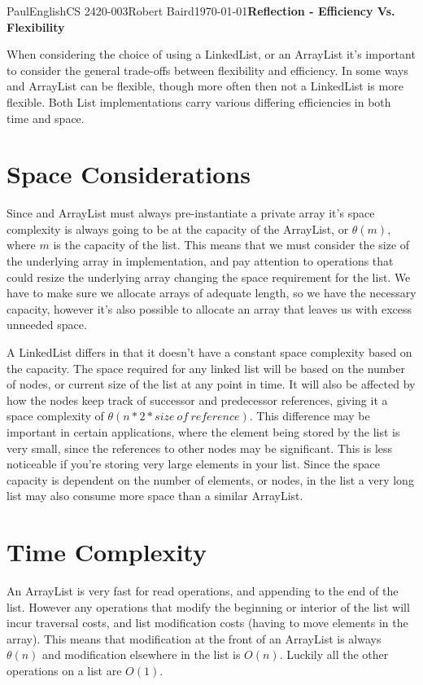 \documentclass[12pt,letterpaper]{article}
\begin{document}
\begin{mla}{Paul}{English}{CS 2420-003}{Robert Baird}{\today}{\textbf{Reflection - Efficiency Vs. Flexibility}}

When considering the choice of using a LinkedList, or an ArrayList it's important to consider the general trade-offs between flexibility and efficiency. In some ways and ArrayList can be flexible, though more often then not a LinkedList is more flexible. Both List implementations carry various differing efficiencies in both time and space.

\section{Space Considerations}

Since and ArrayList must always pre-instantiate a private array it's space complexity is always going to be at the capacity of the ArrayList, or $\theta(m)$, where $m$ is the capacity of the list. This means that we must consider the size of the underlying array in implementation, and pay attention to operations that could resize the underlying array changing the space requirement for the list. We have to make sure we allocate arrays of adequate length, so we have the necessary capacity, however it's also possible to allocate an array that leaves us with excess unneeded space.

A LinkedList differs in that it doesn't have a constant space complexity based on the capacity. The space required for any linked list will be based on the number of nodes, or current size of the list at any point in time. It will also be affected by how the nodes keep track of successor and predecessor references, giving it a space complexity of $\theta(n * 2 * size\ of\ reference)$. This difference may be important in certain applications, where the element being stored by the list is very small, since the references to other nodes may be significant. This is less noticeable if you're storing very large elements in your list. Since the space capacity is dependent on the number of elements, or nodes, in the list a very long list may also consume more space than a similar ArrayList.

\section{Time Complexity}

An ArrayList is very fast for read operations, and appending to the end of the list. However any operations that modify the beginning or interior of the list will incur traversal costs, and list modification costs (having to move elements in the array). This means that modification at the front of an ArrayList is always $\theta(n)$ and modification elsewhere in the list is $O(n)$. Luckily all the other operations on a list are $O(1)$.


\end{mla}
\end{document}
